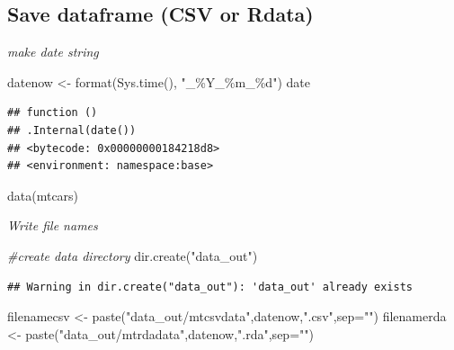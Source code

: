 \documentclass[
]{article}
\newenvironment{Shaded}{\begin{snugshade}}{\end{snugshade}}
\newcommand{\AttributeTok}[1]{\textcolor[rgb]{0.77,0.63,0.00}{#1}}
\newcommand{\CommentTok}[1]{\textcolor[rgb]{0.56,0.35,0.01}{\textit{#1}}}
\newcommand{\FunctionTok}[1]{\textcolor[rgb]{0.00,0.00,0.00}{#1}}
\newcommand{\NormalTok}[1]{#1}
\newcommand{\OtherTok}[1]{\textcolor[rgb]{0.56,0.35,0.01}{#1}}
\newcommand{\StringTok}[1]{\textcolor[rgb]{0.31,0.60,0.02}{#1}}
\begin{document}
\hypertarget{save-dataframe-csv-or-rdata}{%
\subsection{Save dataframe (CSV or Rdata)}\label{save-dataframe-csv-or-rdata}}

\emph{make date string}

\begin{Shaded}
\begin{Highlighting}[]
\NormalTok{datenow }\OtherTok{\textless{}{-}} \FunctionTok{format}\NormalTok{(}\FunctionTok{Sys.time}\NormalTok{(), }\StringTok{"\_\%Y\_\%m\_\%d"}\NormalTok{)}
\NormalTok{date}
\end{Highlighting}
\end{Shaded}

\begin{verbatim}
## function () 
## .Internal(date())
## <bytecode: 0x00000000184218d8>
## <environment: namespace:base>
\end{verbatim}

\begin{Shaded}
\begin{Highlighting}[]
\FunctionTok{data}\NormalTok{(mtcars)}
\end{Highlighting}
\end{Shaded}

\emph{Write file names}

\begin{Shaded}
\begin{Highlighting}[]
\CommentTok{\#create data directory}
\FunctionTok{dir.create}\NormalTok{(}\StringTok{"data\_out"}\NormalTok{)}
\end{Highlighting}
\end{Shaded}

\begin{verbatim}
## Warning in dir.create("data_out"): 'data_out' already exists
\end{verbatim}

\begin{Shaded}
\begin{Highlighting}[]
\NormalTok{filenamecsv }\OtherTok{\textless{}{-}} \FunctionTok{paste}\NormalTok{(}\StringTok{"data\_out/mtcsvdata"}\NormalTok{,datenow,}\StringTok{".csv"}\NormalTok{,}\AttributeTok{sep=}\StringTok{""}\NormalTok{)}
\NormalTok{filenamerda }\OtherTok{\textless{}{-}} \FunctionTok{paste}\NormalTok{(}\StringTok{"data\_out/mtrdadata"}\NormalTok{,datenow,}\StringTok{".rda"}\NormalTok{,}\AttributeTok{sep=}\StringTok{""}\NormalTok{)}
\end{Highlighting}
\end{Shaded}
\end{document}
